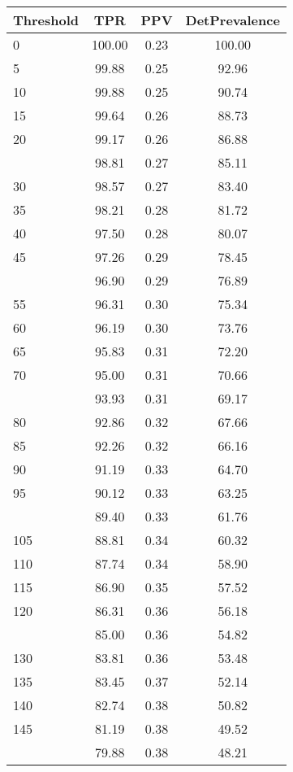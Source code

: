 \begin{table}[ht]
\centering
\begin{tabular}{lccc}
  \toprule
Threshold & TPR & PPV & DetPrevalence \\ 
  \midrule
0 & 100.00 & 0.23 & 100.00 \\ 
  5 & 99.88 & 0.25 & 92.96 \\ 
  10 & 99.88 & 0.25 & 90.74 \\ 
  15 & 99.64 & 0.26 & 88.73 \\ 
  20 & 99.17 & 0.26 & 86.88 \\ 
   \addlinespace
25 & 98.81 & 0.27 & 85.11 \\ 
  30 & 98.57 & 0.27 & 83.40 \\ 
  35 & 98.21 & 0.28 & 81.72 \\ 
  40 & 97.50 & 0.28 & 80.07 \\ 
  45 & 97.26 & 0.29 & 78.45 \\ 
   \addlinespace
50 & 96.90 & 0.29 & 76.89 \\ 
  55 & 96.31 & 0.30 & 75.34 \\ 
  60 & 96.19 & 0.30 & 73.76 \\ 
  65 & 95.83 & 0.31 & 72.20 \\ 
  70 & 95.00 & 0.31 & 70.66 \\ 
   \addlinespace
75 & 93.93 & 0.31 & 69.17 \\ 
  80 & 92.86 & 0.32 & 67.66 \\ 
  85 & 92.26 & 0.32 & 66.16 \\ 
  90 & 91.19 & 0.33 & 64.70 \\ 
  95 & 90.12 & 0.33 & 63.25 \\ 
   \addlinespace
100 & 89.40 & 0.33 & 61.76 \\ 
  105 & 88.81 & 0.34 & 60.32 \\ 
  110 & 87.74 & 0.34 & 58.90 \\ 
  115 & 86.90 & 0.35 & 57.52 \\ 
  120 & 86.31 & 0.36 & 56.18 \\ 
   \addlinespace
125 & 85.00 & 0.36 & 54.82 \\ 
  130 & 83.81 & 0.36 & 53.48 \\ 
  135 & 83.45 & 0.37 & 52.14 \\ 
  140 & 82.74 & 0.38 & 50.82 \\ 
  145 & 81.19 & 0.38 & 49.52 \\ 
   \addlinespace
150 & 79.88 & 0.38 & 48.21 \\ 

\end{tabular}
\end{table}
